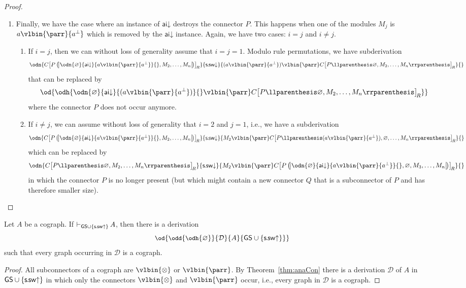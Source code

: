 \documentclass{lmcs} %
\newcommand{\proves}[2][]{\mathord{\vdash_{#1}\,}{#2}}
\renewcommand{\emptyset}{\varnothing}
\def\unit{\emptyset}
\def\GS{\mathsf{GS}}
\newcommand{\connn}[1]{\llparenthesis#1\rrparenthesis}
\newcommand{\Connn}[1]{\begin{pmatrix}\!\begin{vmatrix}#1\end{vmatrix}\!\end{pmatrix}}  %
\newcommand{\Coons}[2]{\!\begin{bmatrix}#1\end{bmatrix}_{\!#2}}  						%
\def\aidr{\dairule}
\def\ssdr{\dssrule}
\def\ssur{\ussrule}
\def\ods#1#2#3#4{\od{\odd{\odh{#1}}{#2}{#3}{#4}}}
\def\set#1{\{#1\}}
\def\cneg#1{{#1^\bot}}
\def\lpar{\vlbin{\parr}}
\def\ltens{\vlbin{\otimes}}
\def\airule{\mathsf{ai}}
\def\dairule{\airule\mathord{\downarrow}}
\def\ssrule{\mathsf{s\mkern-1mu.\mkern-1mu sw}}
\def\ussrule{\ssrule\mathord{\uparrow}}
\def\dssrule{\ssrule\mathord{\downarrow}}
\def\gC{C}
\def\gM{M}
\def\gP{P}
\def\gQ{Q}
\newcommand{\dD}{\mathcal{D}}
\theoremstyle{plain}
\begin{document}
\begin{proof}
\begin{enumerate}
		
  \item 
    Finally, we have the case where an instance of $\aidr$ destroys the
    connector $\gP$. This happens when one of the modules $\gM_j$ is
    $a\lpar\cneg a$ which is removed by the $\aidr$ instance. Again,
    we have two cases: $i=j$ and $i\neq j$.
    \begin{enumerate}
    \item If $i=j$, then we can without loss of generality assume that
      $i=j=1$. Modulo rule permutations, we have subderivation
      $$
      \odn{
	\gC\Coons{\gP\Connn{\odn{\unit}{\aidr}{a\lpar\cneg a}{},
	    \gM_2, \ldots, \gM_n
	  }
	}{R}
      }{\ssdr}{(a\lpar \cneg a) \lpar \gC\Coons{\gP\connn{\unit,
	    \gM_2, \ldots, \gM_n
	  }
	}{R}}{}
      $$
      that can be replaced by
      $$
      \od{\odh{
          \odn{\unit}{\aidr}{(a\lpar \cneg a)}{}
          \lpar \gC\Coons{\gP\connn{\unit,\gM_2, \ldots, \gM_n}}{R}}}
      $$
      where the connector $\gP$ does not occur anymore.
    \item If $i\neq j$, we can assume without loss of generality that
      $i=2$ and $j=1$, i.e., we have a subderivation
      $$
      \odn{
	\gC\Coons{\gP\Connn{\odn{\unit}{\aidr}{a\lpar \cneg a}{},
	    \gM_2, \ldots, \gM_n
	  }
	}{R}
      }{\ssdr}{\gM_2 \lpar \gC\Coons{\gP\connn{(a\lpar \cneg a),
	    \unit, \ldots, \gM_n
	  }
	}{R}}{}
      $$
      which can be replaced by
      $$
      \odn{\gC\Coons{\gP\connn{\unit, \gM_2, \ldots, \gM_n}}{R}
      }{\ssdr}{
	\gM_2 \lpar \gC\Coons{\gP\Connn{\odn{\unit}{\aidr}{a\lpar \cneg a}{}, \unit,\gM_3, \ldots, \gM_n}}{R}
      }{}
      $$ in which the connector $\gP$ is no longer present (but which
      might contain a new connector $\gQ$ that is a subconnector of $\gP$ and has therefore smaller size). \qedhere
    \end{enumerate}
  \end{enumerate}
  \end{proof}
	

\begin{cor}\label{cor:cocons}
	Let $A$ be a cograph. If $\proves[\GS\cup\set{\ssur}]A$, then there is a derivation 
	\begin{equation}
		\small
		\ods{\unit}{\dD}{A}{\GS\cup\set{\ssur}}
	\end{equation}
	such that every graph occurring in $\dD$ is a cograph.
\end{cor}
\begin{proof}
	All subconnectors of a cograph are $\ltens$ or $\lpar$.
	By Theorem~\ref{thm:anaCon} 
	there is a derivation $\dD$ of $A$ in $\GS\cup\set\ssur$ 
	in which only the connectors $\ltens$ and $\lpar$ occur, i.e., every graph in $\dD$ is a cograph.
\end{proof}
\end{document}
